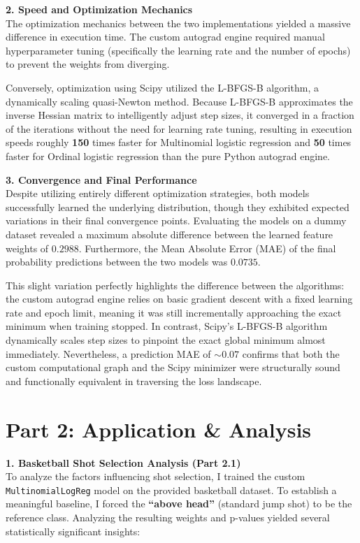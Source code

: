 \documentclass[fleqn,moreauthors,10pt]{ds_report}
\begin{document}
\textbf{2. Speed and Optimization Mechanics}\\
The optimization mechanics between the two implementations yielded a massive difference in execution time. 
The custom autograd engine required manual hyperparameter tuning (specifically the learning rate and the 
number of epochs) to prevent the weights from diverging. 

Conversely, optimization using Scipy utilized the L-BFGS-B algorithm, a dynamically scaling quasi-Newton 
method. Because L-BFGS-B approximates the inverse Hessian matrix to intelligently adjust step sizes, it 
converged in a fraction of the iterations without the need for learning rate tuning, resulting in 
execution speeds roughly \textbf{150} times faster for Multinomial logistic regression and \textbf{50} 
times faster for Ordinal logistic regression than the pure Python autograd engine.
\vspace{0.3cm}

\textbf{3. Convergence and Final Performance}\\
Despite utilizing entirely different optimization strategies, both models successfully learned the 
underlying distribution, though they exhibited expected variations in their final convergence points. 
Evaluating the models on a dummy dataset revealed a maximum absolute difference between the learned 
feature weights of $0.2988$. Furthermore, the Mean Absolute Error (MAE) of the final probability 
predictions between the two models was $0.0735$. 

This slight variation perfectly highlights the difference between the algorithms: the custom autograd 
engine relies on basic gradient descent with a fixed learning rate and epoch limit, meaning it was 
still incrementally approaching the exact minimum when training stopped. In contrast, Scipy's L-BFGS-B 
algorithm dynamically scales step sizes to pinpoint the exact global minimum almost immediately. 
Nevertheless, a prediction MAE of $\sim 0.07$ confirms that both the custom computational graph and the 
Scipy minimizer were structurally sound and functionally equivalent in traversing the loss landscape.


\section*{Part 2: Application \& Analysis}

\textbf{1. Basketball Shot Selection Analysis (Part 2.1)}\\
To analyze the factors influencing shot selection, I trained the custom \texttt{MultinomialLogReg} model 
on the provided basketball dataset. To establish a meaningful baseline, I forced the \textbf{``above head''} 
(standard jump shot) to be the reference class. Analyzing the resulting weights and p-values yielded 
several statistically significant insights:
\end{document}
